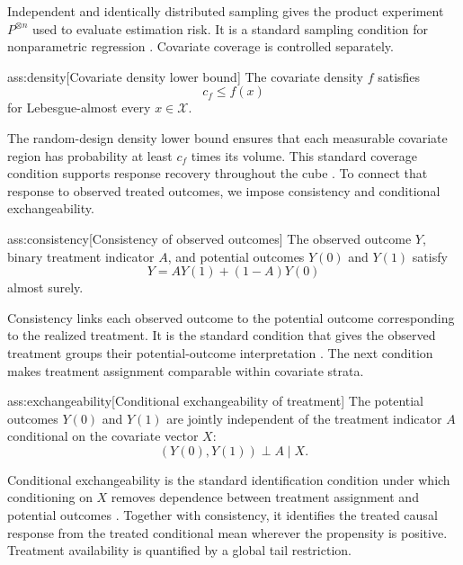 Independent and identically distributed sampling gives the product experiment \(P^{\otimes n}\) used to evaluate estimation risk. It is a standard sampling condition for nonparametric regression \citep{Stone1982}. Covariate coverage is controlled separately.

\begin{assumptionv}{ass:density}[Covariate density lower bound]
The covariate density \(f\) satisfies
\[
c_f\le f(x)
\]
for Lebesgue-almost every \(x\in\mathcal X\).
\end{assumptionv}

The random-design density lower bound ensures that each measurable covariate region has probability at least \(c_f\) times its volume. This standard coverage condition supports response recovery throughout the cube \citep{Stone1982}. To connect that response to observed treated outcomes, we impose consistency and conditional exchangeability.

\begin{assumptionv}{ass:consistency}[Consistency of observed outcomes]
The observed outcome \(Y\), binary treatment indicator \(A\), and potential outcomes \(Y(0)\) and \(Y(1)\) satisfy
\[
Y=AY(1)+(1-A)Y(0)
\]
almost surely.
\end{assumptionv}

Consistency links each observed outcome to the potential outcome corresponding to the realized treatment. It is the standard condition that gives the observed treatment groups their potential-outcome interpretation \citep{KennedyBalakrishnanRobinsWasserman2024}. The next condition makes treatment assignment comparable within covariate strata.

\begin{assumptionv}{ass:exchangeability}[Conditional exchangeability of treatment]
The potential outcomes \(Y(0)\) and \(Y(1)\) are jointly independent of the treatment indicator \(A\) conditional on the covariate vector \(X\):
\[
(Y(0),Y(1))\perp A\mid X.
\]
\end{assumptionv}

Conditional exchangeability is the standard identification condition under which conditioning on \(X\) removes dependence between treatment assignment and potential outcomes \citep{KennedyBalakrishnanRobinsWasserman2024}. Together with consistency, it identifies the treated causal response from the treated conditional mean wherever the propensity is positive. Treatment availability is quantified by a global tail restriction.

